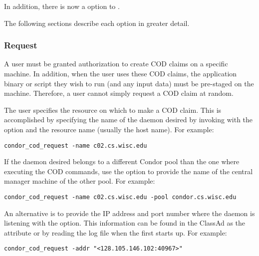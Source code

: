 In addition, there is now a  option to .

The following sections describe each option in greater detail.

\subsubsection{\label{sec:cod-claim-request}Request}

A user must be granted authorization to create COD
claims on a specific machine.
In addition, when the user uses these COD claims, the application
binary or script they wish to run (and any input data) must be
pre-staged on the machine.
Therefore, a user cannot simply request a COD claim at random.

The user specifies the resource on which to make a COD claim.
This is accomplished by specifying the name of the
 daemon desired by invoking
 with the  option and the
resource name (usually the host name).
For example:
\begin{verbatim}
condor_cod_request -name c02.cs.wisc.edu
\end{verbatim}

If the  daemon desired belongs to a different Condor
pool than the one where executing the COD commands,
use the  option to provide the name of the central manager
machine of the other pool.  For example:
\begin{verbatim}
condor_cod_request -name c02.cs.wisc.edu -pool condor.cs.wisc.edu
\end{verbatim}

An alternative is to provide the IP address and port number
where the  daemon is listening
with the  option.
This information can be found in the  ClassAd as the
attribute  or by reading the log file when the
 first starts up.
For example:
\begin{verbatim}
condor_cod_request -addr "<128.105.146.102:40967>"
\end{verbatim}
  
